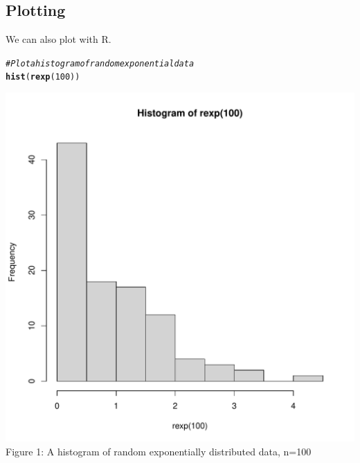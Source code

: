 \documentclass{article}\usepackage[]{graphicx}\usepackage[]{xcolor}
\makeatletter
\def\maxwidth{ %
  \ifdim\Gin@nat@width>\linewidth
    \linewidth
  \else
    \Gin@nat@width
  \fi
}
\newcommand{\hlnum}[1]{\textcolor[rgb]{0.686,0.059,0.569}{#1}}%
\newcommand{\hlcom}[1]{\textcolor[rgb]{0.678,0.584,0.686}{\textit{#1}}}%
\newcommand{\hldef}[1]{\textcolor[rgb]{0.345,0.345,0.345}{#1}}%
\newcommand{\hlkwd}[1]{\textcolor[rgb]{0.737,0.353,0.396}{\textbf{#1}}}%
\newenvironment{kframe}{%
 \def\at@end@of@kframe{}%
 \ifinner\ifhmode%
  \def\at@end@of@kframe{\end{minipage}}%
  \begin{minipage}{\columnwidth}%
 \fi\fi%
 \def\FrameCommand##1{\hskip\@totalleftmargin \hskip-\fboxsep
 \colorbox{shadecolor}{##1}\hskip-\fboxsep
     \hskip-\linewidth \hskip-\@totalleftmargin \hskip\columnwidth}%
 \MakeFramed {\advance\hsize-\width
   \@totalleftmargin\z@ \linewidth\hsize
   \@setminipage}}%
 {\par\unskip\endMakeFramed%
 \at@end@of@kframe}
\newenvironment{knitrout}{}{} %
\makeatother
\begin{document}
\begin{multicols}{2}
\subsection{Plotting}
We can also plot with R.
\begin{knitrout}\scriptsize
{}\color{fgcolor}\begin{kframe}
\begin{alltt}
\hlcom{#Plot a histogram of random exponential data}
\hlkwd{hist}\hldef{(}\hlkwd{rexp}\hldef{(}\hlnum{100}\hldef{))}
\end{alltt}
\end{kframe}
\includegraphics[width=\maxwidth]{figure/unnamed-chunk-6-1} 
\end{knitrout}
Figure 1: A histogram of random exponentially distributed data, n=100

\end{multicols}
\end{document}
